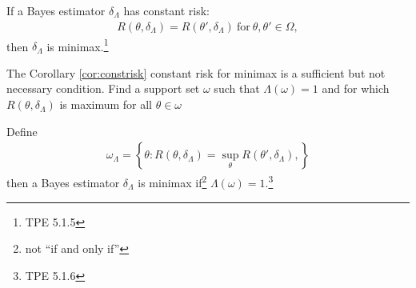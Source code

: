\begin{corollary}\label{cor:constrisk}
    If a Bayes estimator $\delta_\Lambda$ has constant risk: 
    \begin{gather}
        R(\theta,\delta_\Lambda)=R(\theta',\delta_\Lambda)~\text{for}~\theta,\theta'\in\Omega,
    \end{gather}
    then $\delta_\Lambda$ is minimax.\footnote{TPE 5.1.5}
\end{corollary}

\begin{note}
    The Corollary \ref{cor:constrisk} constant risk for minimax is a sufficient but not necessary condition.
    {\color{blue}Find a support set $\omega$ such that $\Lambda(\omega)=1$ and for which
    $R(\theta,\delta_\Lambda)$ is maximum for all $\theta\in\omega$}
\end{note}


\begin{corollary}\label{cor:singlevar}
    Define 
    \begin{gather}
        \omega_\Lambda=\left\{
            \theta:R(\theta,\delta_\Lambda)=\sup_\theta{R(\theta',\delta_\Lambda)},
        \right\}
    \end{gather}
        then a Bayes estimator $\delta_\Lambda$ is minimax if\footnote{
        not ``if and only if''
        } $\Lambda(\omega)=1$.\footnote{TPE 5.1.6}
\end{corollary}

